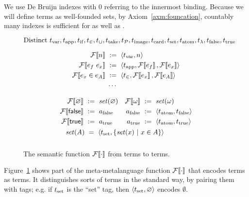 We use De Bruijn indexes with $0$ referring to the innermost binding. Because we will define \targetlang terms as well-founded sets, by Axiom~\ref{axm:founcation}, countably many indexes is sufficient for \targetlang as well as \ftargetlang.

\begin{figure*}[tb]\centering
\begin{equation*}
\text{Distinct }\tvar,\tapp,\tif,\tin,\tunion,\ttake,\tpowerset,\timage,\torder,\tset,\tatom,\tfun,\tfalse,\ttrue \vspace{-\baselineskip}
\end{equation*}
\begin{varwidth}[t]{\textwidth}
\begin{equation*}
\begin{aligned}
	\mathcal{F}\!\left\llbracket{n}\right\rrbracket &\ :=\ \langle{t_\mathrm{var},n}\rangle \\
	\mathcal{F}\!\left\llbracket{{e_f}\ {e_x}}\right\rrbracket &\ :=\ \langle{t_\mathrm{app},\mathcal{F}\!\left\llbracket{e_f}\right\rrbracket,\mathcal{F}\!\left\llbracket{e_x}\right\rrbracket}\rangle \\
	\mathcal{F}\!\left\llbracket{e_x \in e_A}\right\rrbracket &\ :=\ \langle{t_\in,\mathcal{F}\!\left\llbracket{e_x}\right\rrbracket,\mathcal{F}\!\left\llbracket{e_A}\right\rrbracket}\rangle \\
	&\;\cdots
\end{aligned}
\end{equation*}
\end{varwidth}
\hspace{0.09in}
%
\begin{varwidth}[t]{\textwidth}
\begin{equation*}
\begin{aligned}
&\begin{aligned}
	\mathcal{F}\!\left\llbracket{\varnothing}\right\rrbracket &\ :=\ \mathit{set}(\varnothing) &
\mathcal{F}\!\left\llbracket{\omega}\right\rrbracket &\ :=\ \mathit{set}(\omega) \\
	\mathcal{F}\!\left\llbracket{\mathsf{false}}\right\rrbracket &\ :=\ a_\mathrm{false} &
a_\mathrm{false} &\ :=\ \langle{t_\mathrm{atom},t_\mathrm{false}}\rangle \\
	\mathcal{F}\!\left\llbracket{\mathsf{true}}\right\rrbracket &\ :=\ a_\mathrm{true} &
a_\mathrm{true} &\ :=\ \langle{t_\mathrm{atom},t_\mathrm{true}}\rangle
\end{aligned} \\
	&\ \ \,\mathit{set}(A) \ =\ \langle{t_\mathrm{set}, \lbrace {\mathit{set}(x)} \ \lvert\ {x \in A} \rbrace}\rangle
	\\[0.5\baselineskip]
\end{aligned}
\end{equation*}
\end{varwidth}
\bottomhrule
\caption[Semantic function $\enc{\cdot}$]{The semantic function $\enc{\cdot}$ from \ftargetlang terms to \targetlang terms.}
\label{fig:encoding}
\end{figure*}

Figure~\ref{fig:encoding} shows part of the meta-metalanguage function $\mathcal{F}\!\left\llbracket{\cdot}\right\rrbracket$ that encodes \ftargetlang terms as \targetlang terms. It distinguishes sorts of terms in the standard way, by pairing them with tags; e.g. if $t_\mathrm{set}$ is the ``set'' tag, then $\langle{t_\mathrm{set},\varnothing}\rangle$ encodes $\emptyset$.

